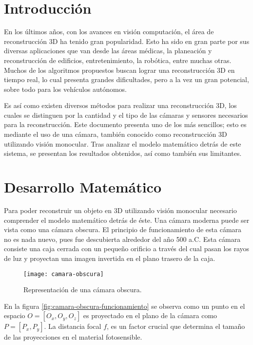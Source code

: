 \documentclass[]{article}
\begin{document}


\section{Introducción}

En los últimos años, con los avances en visión computación, el área de reconstrucción 3D ha tenido gran popularidad. Esto ha sido en gran parte por sus diversas aplicaciones que van desde las áreas médicas, la planeación y reconstrucción de edificios, entretenimiento, la robótica, entre muchas otras. Muchos de los algoritmos propuestos buscan lograr una reconstrucción 3D en tiempo real, lo cual presenta grandes dificultades, pero a la vez un gran potencial, sobre todo para los vehículos autónomos.

Es así como existen diversos métodos para realizar una reconstrucción 3D, los cuales se distinguen por la cantidad y el tipo de las cámaras y sensores necesarios para la reconstrucción. Este documento presenta uno de los más sencillos; esto es mediante el uso de una cámara, también conocido como reconstrucción 3D utilizando visión monocular. Tras analizar el modelo matemático detrás de este sistema, se presentan los resultados obtenidos, así como también sus limitantes.

\section{Desarrollo Matemático}

Para poder reconstruir un objeto en 3D utilizando visión monocular necesario comprender el modelo matemático detrás de éste. Una cámara moderna puede ser vista como una cámara obscura. El principio de funcionamiento de esta cámara no es nada nuevo, pues fue descubierta alrededor del año 500 a.C. Esta cámara consiste una caja cerrada con un pequeño orificio a través del cual pasan los rayos de luz y proyectan una imagen invertida en el plano trasero de la caja.

\begin{figure}[H]
	\centering
	\texttt{[image: camara-obscura]}
	\caption{Representación de una cámara obscura.}
	\label{fig:camara-obscura}
\end{figure}

En la figura \ref{fig:camara-obscura-funcionamiento} se observa como un punto en el espacio $O = [O_x, O_y, O_z]$ es proyectado en el plano de la cámara como $P = [P_x, P_y]$. La distancia focal $f$, es un factor crucial que determina el tamaño de las proyecciones en el material fotosensible.
\end{document}
